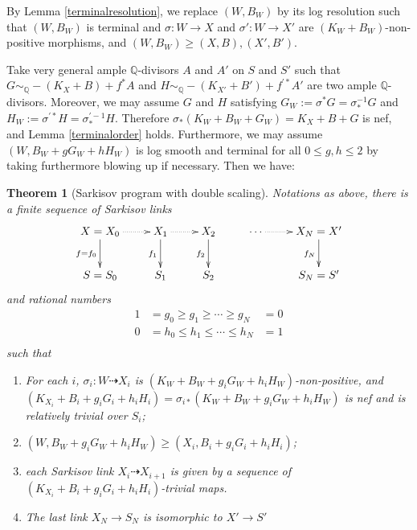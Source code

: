\documentclass[11pt]{amsart}
\numberwithin{equation}{section}
\newtheorem{thm}[defn]{Theorem}
\begin{document}
By Lemma \ref{terminalresolution}, we  replace $(W,B_W)$ by its log resolution such that $(W,B_{W})$ is terminal and $\sigma:W\to X$ and $\sigma':W\to X'$ are $(K_W+B_W)$-non-positive morphisms, and $(W,B_W)\geqslant (X,B),(X',B')$. 

Take  very general ample $\mathbb{Q}$-divisors $ A $ and $ A' $ on $ S $ and $ S' $ such that $ G\sim_{\mathbb{Q}}-(K_X+B)+f^*A $ and $ H\sim_{\mathbb{Q}}-(K_{X'}+B')+f^{'*}A' $ are two ample $\mathbb{Q}$-divisors. Moreover, we may assume $ G $ and $ H $ satisfying $G_{W}:= \sigma^*G=\sigma^{-1}_*G $ and $ H_{W}:=\sigma^{'*}H=\sigma^{'-1}_*H $. Therefore $\sigma_{*}(K_{W}+B_{W}+G_{W})=K_{X}+B+G$ is nef, and Lemma \ref{terminalorder} holds.
Furthermore, we may assume $(W,B_W+gG_W+hH_W)$ is log smooth and terminal for all $0\leqslant g,h\leqslant 2$ by taking furthermore blowing up if necessary.
Then we have:
\begin{thm}[Sarkisov program with double scaling]\label{main2}
Notations as above, there is a finite sequence of Sarkisov links
\[
  \xymatrix{
    X=X_0\ar@{.>}[r]\ar[d]_{f=f_{0}}&X_{1}\ar@{.>}[r]\ar[d]_{f_{1}}& X_{2}\ar[d]_{f_{2}} &\cdots\ar@{.>}[r]&X_N=X'\ar[d]_{f_{N}} \\
    S=S_{0}&S_{1} &S_{2}&&S_N=S'
  }
\]
and rational numbers
\[
  \begin{aligned}
    1&=g_0\geqslant g_1 \geqslant \cdots \geqslant g_N&=0\\
    0&=h_0\leqslant h_{1} \leqslant \cdots \leqslant h_N&=1\\
  \end{aligned}
\]
such that 
\begin{enumerate}
  \item For each $i$, $\sigma_i:W\dashrightarrow  X_{i}$ is $(K_{W}+B_{W}+g_{i}G_{W}+h_{i}H_{W})$-non-positive, and $(K_{X_{i}}+B_{i}+g_{i}G_{i}+h_{i}H_{i})=\sigma_{i*}(K_{W}+B_{W}+g_{i}G_{W}+h_{i}H_{W})$ is nef and is relatively trivial over $S_{i}$;
  \item $(W,B_{W}+g_{i}G_{W}+h_{i}H_{W})\geqslant (X_{i},B_{i}+g_{i}G_{i}+h_{i}H_{i})$;
  \item each Sarkisov link $X_{i}\dashrightarrow X_{i+1}$ is given by a sequence of $(K_{X_{i}}+B_{i}+g_{i}G_{i}+h_{i}H_{i})$-trivial maps.
    \item  The last link $X_{N} \to S_{N}$ is isomorphic to $X'\to S'$
\end{enumerate}
\end{thm}
\end{document}
